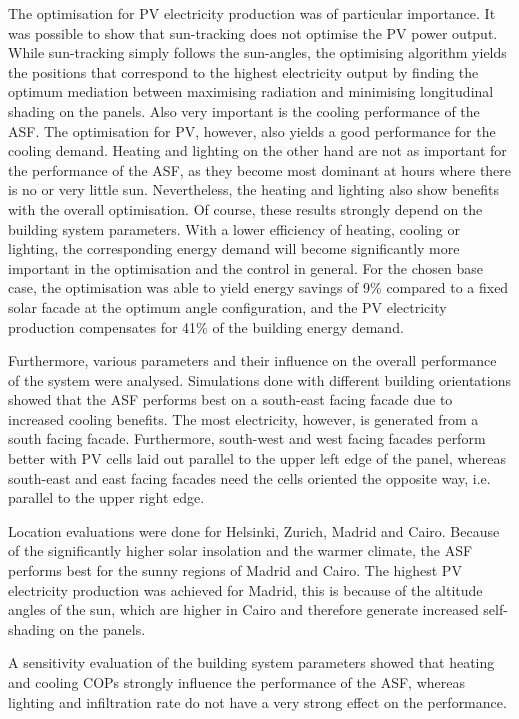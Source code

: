 The optimisation for PV electricity production was of particular importance. It was possible to show that sun-tracking does not optimise the PV power output. While sun-tracking simply follows the sun-angles, the optimising algorithm yields the positions that correspond to the highest electricity output by finding the optimum mediation between maximising radiation and minimising longitudinal shading on the panels. Also very important is the cooling performance of the ASF. The optimisation for PV, however, also yields a good performance for the cooling demand. Heating and lighting on the other hand are not as important for the performance of the ASF, as they become most dominant at hours where there is no or very little sun. Nevertheless, the heating and lighting also show benefits with the overall optimisation. Of course, these results strongly depend on the building system parameters. With a lower efficiency of heating, cooling or lighting, the corresponding energy demand will become significantly more important in the optimisation and the control in general. For the chosen base case, the optimisation was able to yield energy savings of 9\% compared to a fixed solar facade at the optimum angle configuration, and the PV electricity production compensates for 41\% of the building energy demand. 

Furthermore, various parameters and their influence on the overall performance of the system were analysed. Simulations done with different building orientations showed that the ASF performs best on a south-east facing facade due to increased cooling benefits. The most electricity, however, is generated from a south facing facade. Furthermore, south-west and west facing facades perform better with PV cells laid out parallel to the upper left edge of the panel, whereas south-east and east facing facades need the cells oriented the opposite way, i.e. parallel to the upper right edge. 

Location evaluations were done for Helsinki, Zurich, Madrid and Cairo. Because of the significantly higher solar insolation and the warmer climate, the ASF performs best for the sunny regions of Madrid and Cairo. The highest PV electricity production was achieved for Madrid, this is because of the altitude angles of the sun, which are higher in Cairo and therefore generate increased self-shading on the panels. 

A sensitivity evaluation of the building system parameters showed that heating and cooling COPs strongly influence the performance of the ASF, whereas lighting and infiltration rate do not have a very strong effect on the performance. 

